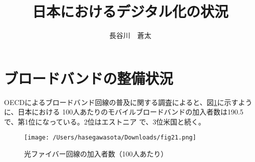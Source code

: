 \documentclass[a4paper,11pt,dvipdfmx]{ujarticle}
\title{日本におけるデジタル化の状況}
\author{長谷川　蒼太}
\begin{document}
\maketitle %

\section{ブロードバンドの整備状況}
OECDによるブロードバンド回線の普及に関する調査\cite{oecd}によると、図\ref{fig:myFig}に示すように、日本における 100人あたりのモバイルブロードバンドの加入者数は190.5で、第1位になっている。2位はエストニア
で、3位米国と続く。



\begin{figure}[htbp]
    \centering
    \texttt{[image: /Users/hasegawasota/Downloads/fig21.png]}
    \caption{光ファイバー回線の加入者数（100人あたり）}\label{fig:myFig}
\end{figure}


\end{document}
